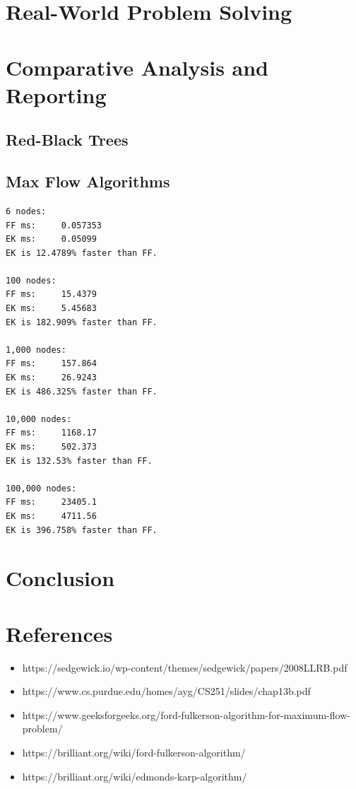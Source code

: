 \documentclass[12pt]{amsart}
\begin{document}
\section{Real-World Problem Solving}

\section{Comparative Analysis and Reporting}

\subsection{Red-Black Trees}

\subsection{Max Flow Algorithms}

\begin{verbatim}
6 nodes:
FF ms:     0.057353
EK ms:     0.05099
EK is 12.4789% faster than FF.

100 nodes:
FF ms:     15.4379
EK ms:     5.45683
EK is 182.909% faster than FF.

1,000 nodes:
FF ms:     157.864
EK ms:     26.9243
EK is 486.325% faster than FF.

10,000 nodes:
FF ms:     1168.17
EK ms:     502.373
EK is 132.53% faster than FF.

100,000 nodes:
FF ms:     23405.1
EK ms:     4711.56
EK is 396.758% faster than FF.

\end{verbatim}

\section{Conclusion}

\section{References}

\begin{itemize}
    \item https://sedgewick.io/wp-content/themes/sedgewick/papers/2008LLRB.pdf
    \item https://www.cs.purdue.edu/homes/ayg/CS251/slides/chap13b.pdf
    \item https://www.geeksforgeeks.org/ford-fulkerson-algorithm-for-maximum-flow-problem/
    \item https://brilliant.org/wiki/ford-fulkerson-algorithm/    
    \item https://brilliant.org/wiki/edmonds-karp-algorithm/
\end{itemize}
\end{document}

